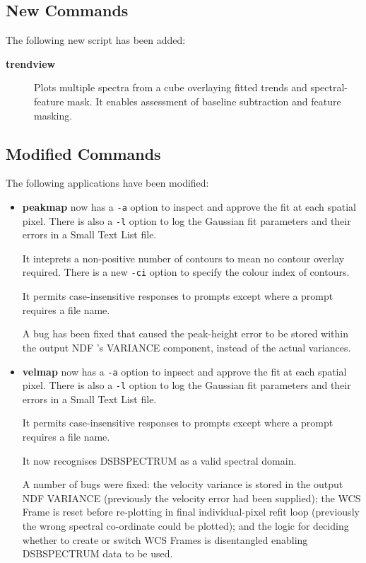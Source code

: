 \documentclass[twoside,11pt]{article}
\newcommand{\htmlref}[2]{#1}
\newcommand{\xref}[3]{#1}
\renewcommand{\_}{\texttt{\symbol{95}}}
\begin{document}
\subsection{New Commands}
The following new script has been added:

\begin{description}
   \item [\htmlref{{\bf trendview}}{trendview}] \mbox{}
     Plots multiple spectra from a cube overlaying fitted trends and
     spectral-feature mask.  It enables assessment of baseline
     subtraction and feature masking.
\end{description}

\subsection{Modified Commands}
The following applications have been modified:

\begin{itemize}

\item \htmlref{{\bf peakmap}}{peakmap} now has  a {\tt -a} option to
inspect and approve the fit at each spatial pixel.  There is also a
{\tt -l} option to log the Gaussian fit parameters and their errors in
a \xref{Small Text List}{sun190}{} file.

It inteprets a non-positive number of contours to mean no contour
overlay required.  There is a new {\tt -ci} option to specify the
colour index of contours.

It permits case-insensitive responses to prompts except where a
prompt requires a file name.

A bug has been fixed that caused the peak-height error to be stored
within the output NDF 's \xref{VARIANCE}{sun95}{apndf:variance}
component, instead of the actual variances.

\item \htmlref{{\bf velmap}}{velmap} now has a {\tt -a} option to
inpsect and approve the fit at each spatial pixel. There is also a
{\tt -l} option to log the Gaussian fit parameters and their errors in
a Small Text List file.

It permits case-insensitive responses to prompts except where a
prompt requires a file name.

It now recognises \xref{DSBSPECTRUM}{sun95}{se_domains} as a valid
spectral domain.

A number of bugs were fixed: the velocity variance is stored in the
output NDF VARIANCE (previously the velocity error had been supplied);
the WCS Frame is reset before re-plotting in final individual-pixel
refit loop (previously the wrong spectral co-ordinate could be
plotted); and the logic for deciding whether to create or switch WCS
Frames is disentangled enabling DSBSPECTRUM data to be used.

\end{itemize}
\end{document}
